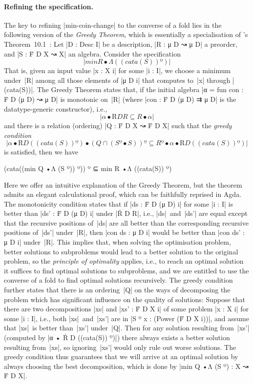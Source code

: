\paragraph{Refining the specification.}
The key to refining |min-coin-change| to the converse of a fold lies in the following version of the \emph{Greedy Theorem}, which is essentially a specialisation of \citeauthor{Bird-AoP}'s Theorem~10.1~\cite{Bird-AoP}:
Let |D : Desc I| be a description, |R : μ D ↝ μ D| a preorder, and |S : Ḟ D X ↝ X| an algebra.
Consider the specification
\[ |min R •Λ ((cata(S)) º)| \]
That is, given an input value |x : X i| for some |i : I|, we choose a minimum under~|R| among all those elements of |μ D i| that computes to~|x| through |(cata(S))|.
The Greedy Theorem states that, if the initial algebra |α = fun con : Ḟ D (μ D) ↝ μ D| is monotonic on~|R| (where |con : Ḟ D (μ D) ⇉ μ D| is the datatype-generic constructor), i.e.,
\[ |α • Ṙ D R ⊆ R • α| \]
and there is a relation (ordering) |Q : Ḟ D X ↝ Ḟ D X| such that the \emph{greedy condition}
\[ |α • Ṙ D ((cata(S)) º) • (Q ∩ (S º • S)) º ⊆ R º • α • Ṙ D ((cata(S)) º)| \]
is satisfied, then we have
\begin{code}(cata((min Q •Λ (S º)) º)) º ⊆ min R •Λ ((cata(S)) º)
\end{code}Here we offer an intuitive explanation of the Greedy Theorem, but the theorem admits an elegant calculational proof, which can be faithfully reprised in Agda.
The monotonicity condition states that if |ds : Ḟ D (μ D) i| for some |i : I| is better than |ds' : Ḟ D (μ D) i| under |Ṙ D R|, i.e., |ds|~and~|ds'| are equal except that the recursive positions of~|ds| are all better than the corresponding recursive positions of~|ds'| under~|R|, then |con ds : μ D i| would be better than |con ds' : μ D i| under~|R|.
This implies that, when solving the optimisation problem, better solutions to subproblems would lead to a better solution to the original problem, so the \emph{principle of optimality} applies, i.e., to reach an optimal solution it suffices to find optimal solutions to subproblems, and we are entitled to use the converse of a fold to find optimal solutions recursively.
The greedy condition further states that there is an ordering~|Q| on the ways of decomposing the problem which has significant influence on the quality of solutions:
Suppose that there are two decompositions |xs| and |xs' : Ḟ D X i| of some problem |x : X i| for some |i : I|, i.e., both |xs|~and~|xs'| are in |S º x : (Power (Ḟ D X i))|, and assume that |xs|~is better than~|xs'| under~|Q|.
Then for any solution resulting from~|xs'| (computed by |α • Ṙ D ((cata(S)) º)|) there always exists a better solution resulting from~|xs|, so ignoring~|xs'| would only rule out worse solutions.
The greedy condition thus guarantees that we will arrive at an optimal solution by always choosing the best decomposition, which is done by |min Q •Λ (S º) : X ↝ Ḟ D X|.

